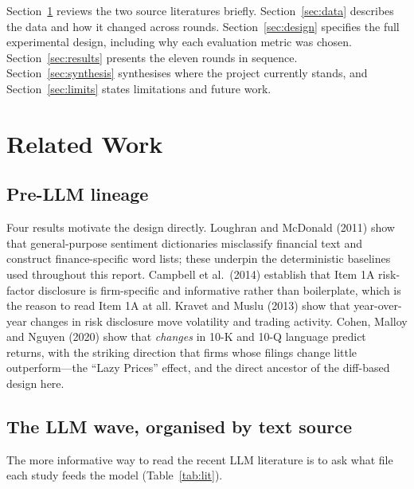 \documentclass[11pt]{article}
\begin{document}
Section~\ref{sec:related} reviews the two source literatures briefly. Section~\ref{sec:data}
describes the data and how it changed across rounds. Section~\ref{sec:design} specifies the
full experimental design, including why each evaluation metric was chosen.
Section~\ref{sec:results} presents the eleven rounds in sequence. Section~\ref{sec:synthesis}
synthesises where the project currently stands, and Section~\ref{sec:limits} states
limitations and future work.

\section{Related Work}
\label{sec:related}

\subsection{Pre-LLM lineage}

Four results motivate the design directly. Loughran and McDonald (2011) show that
general-purpose sentiment dictionaries misclassify financial text and construct
finance-specific word lists; these underpin the deterministic baselines used throughout
this report. Campbell et al.\ (2014) establish that Item 1A risk-factor disclosure is
firm-specific and informative rather than boilerplate, which is the reason to read Item 1A
at all. Kravet and Muslu (2013) show that year-over-year changes in risk disclosure move
volatility and trading activity. Cohen, Malloy and Nguyen (2020) show that
\emph{changes} in 10-K and 10-Q language predict returns, with the striking direction that
firms whose filings change little outperform---the ``Lazy Prices'' effect, and the direct
ancestor of the diff-based design here.

\subsection{The LLM wave, organised by text source}

The more informative way to read the recent LLM literature is to ask what file each study
feeds the model (Table~\ref{tab:lit}).
\end{document}
